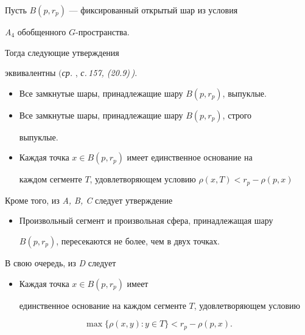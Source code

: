  


\begin{thm} 


Пусть $B(p,r_p)$ --- фиксированный открытый шар из условия 


{\em A${}_4$} обобщенного $G$-пространства. 


 


Тогда следующие утверждения 


эквивалентны $(${\em ср.} \cite{2}, {\em с.\,157, (20.9)\,)}. 


\begin{itemize} 


\item[A.] Все замкнутые шары, принадлежащие шару $B(p,r_p)$, выпуклые.


\item[B.] Все замкнутые шары, принадлежащие шару $B(p,r_p)$, строго 


выпуклые.


\item[C.] Каждая точка $x\in B(p,r_p)$ имеет единственное основание на 


каждом сегменте $T$, удовлетворяющем условию $\rho(x,T)<r_p-\rho(p,x)$ 


\end{itemize} 


Кроме того, из {\em A, B, C} следует утверждение 


\begin{itemize} 


\item[D.] Произвольный сегмент и произвольная сфера, принадлежащая шару 


$B(p,r_p)$, пересекаются не более, чем в двух точках. 


\end{itemize} 


В свою очередь, из {\em D} следует 


\begin{itemize} 


\item[$\wt{\mathrm C}$.] Каждая точка $x\in B(p,r_p)$ имеет 


единственное основание на каждом сегменте $T$, удовлетворяющем условию 


\end{itemize} 


$$ 


\max\{\rho(x,y):y\in T\}<r_p-\rho(p,x). 


$$ 


\end{thm} 


